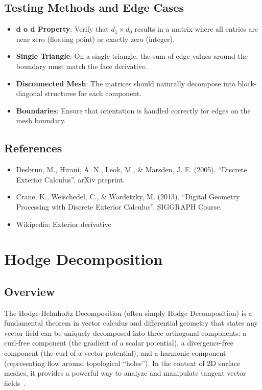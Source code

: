 \subsection{Testing Methods and Edge Cases}
\begin{itemize}
    \item \textbf{d o d Property}: Verify that $d_1 \times d_0$ results in a matrix where all entries are near zero (floating point) or exactly zero (integer).
    \item \textbf{Single Triangle}: On a single triangle, the sum of edge values around the boundary must match the face derivative.
    \item \textbf{Disconnected Mesh}: The matrices should naturally decompose into block-diagonal structures for each component.
    \item \textbf{Boundaries}: Ensure that orientation is handled correctly for edges on the mesh boundary.
\end{itemize}

\subsection{References}
\begin{itemize}
    \item Desbrun, M., Hirani, A. N., Leok, M., \& Marsden, J. E. (2005). ``Discrete Exterior Calculus''. arXiv preprint.
    \item Crane, K., Weischedel, C., \& Wardetzky, M. (2013). ``Digital Geometry Processing with Discrete Exterior Calculus''. SIGGRAPH Course.
    \item Wikipedia: Exterior derivative
\end{itemize}


\section{Hodge Decomposition}
\label{sec:hodge_decomposition}

\subsection{Overview}
The Hodge-Helmholtz Decomposition (often simply Hodge Decomposition) is a fundamental theorem in vector calculus and differential geometry that states any vector field can be uniquely decomposed into three orthogonal components: a curl-free component (the gradient of a scalar potential), a divergence-free component (the curl of a vector potential), and a harmonic component (representing flow around topological ``holes''). In the context of 2D surface meshes, it provides a powerful way to analyze and manipulate tangent vector fields~\cite{crane2013,tong2003}.

